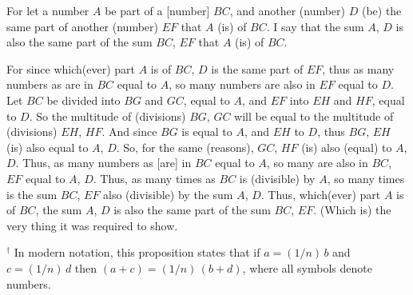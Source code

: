 \begin{Parallel}{}{}
{For let a number $A$ be part of a [number] $BC$, and another (number)
$D$ (be) the same part of another (number) $EF$ that $A$ (is) of $BC$. I say that
the sum  $A$, $D$ is also the same part of the sum $BC$, $EF$ that
$A$ (is) of $BC$.

For since which(ever) part $A$ is of $BC$, $D$ is the same part of $EF$, thus as many
numbers as are in $BC$ equal to $A$, so many numbers are also in 
$EF$ equal to $D$. Let $BC$ be divided into $BG$ and $GC$, equal to $A$, and
$EF$ into $EH$ and $HF$, equal to $D$. So the multitude of (divisions) $BG$,
$GC$ will be equal to the multitude of (divisions) $EH$, $HF$. And
since $BG$ is equal to $A$, and $EH$ to $D$, thus $BG$, $EH$ (is) also equal to $A$, $D$.
So, for the same (reasons), $GC$, $HF$ (is) also (equal) to $A$, $D$. Thus,
as many numbers as [are] in $BC$ equal to $A$, so many are
also in $BC$, $EF$ equal to $A$, $D$. Thus, as many times as $BC$ is (divisible)
by $A$, so many times is the sum $BC$, $EF$ also (divisible)  by the sum $A$, $D$.
Thus, which(ever) part $A$ is of $BC$, the sum $A$, $D$ is also the same
part of the sum $BC$, $EF$. (Which is) the very thing it was required to show.}
\end{Parallel}
{\footnotesize\noindent$^\dag$ In modern notation, this
proposition states that if $a = (1/n)\,b$ and $c = (1/n)\,d$ then $(a+c) = (1/n)\,(b+d)$,
where all symbols denote numbers.}

